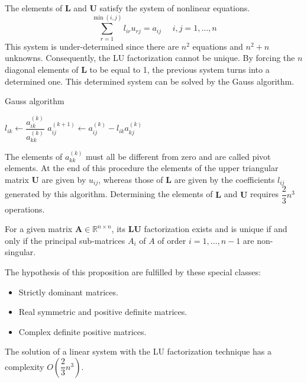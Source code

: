 \documentclass[12pt, a4paper]{report}
\begin{document}
    The elements of $\boldsymbol{L}$ and $\boldsymbol{U}$ satisfy the system of nonlinear equations. 
    \[\sum_{r=1}^{\min{(i,j)}}{l_{ir}u_{rj}}=a_{ij} \:\:\:\:\:\: i,j=1,\dots,n\]
    This system is under-determined since there are $n^2$ equations and $n^2+n$ unknowns. Consequently, the LU factorization cannot be 
    unique. By forcing the $n$ diagonal elements of $\boldsymbol{L}$ to be equal to 1, the previous system turns into a determined 
    one. This determined system can be solved by the Gauss algorithm.
    \begin{algorithm}[H]
        \caption{Gauss algorithm}
            \begin{algorithmic}[1]
                        \State $l_{ik} \leftarrow \dfrac{a_{ik}^{(k)}}{a_{kk}^{(k)}}$
                            \State $a_{ij}^{(k+1)} \leftarrow a_{ij}^{(k)}-l_{ik}a_{kj}^{(k)}$
                        \EndFor
                    \EndFor
                \EndFor
            \end{algorithmic}
    \end{algorithm}
    The elements of $a_{kk}^{(k)}$ must all be different from zero and are called pivot elements. 
    At the end of this procedure the elements of the upper triangular matrix $\boldsymbol{U}$ are given by $u_{ij}$, whereas those of 
    $\boldsymbol{L}$ are given by the coefficients $l_{ij}$ generated by this algorithm. Determining the elements of $\boldsymbol{L}$ 
    and $\boldsymbol{U}$ requires $\dfrac{2}{3}n^3$ operations. 
    \begin{proposition}
        For a given matrix $\boldsymbol{A} \in \mathbb{R}^{n \times n}$, its $\boldsymbol{LU}$ factorization exists and is unique 
        if and only if the principal sub-matrices $A_i$ of $A$ of order $i=1,\dots,n-1$ are non-singular. 
    \end{proposition}
    The hypothesis of this proposition are fulfilled by these special classes: 
    \begin{itemize}
        \item Strictly dominant matrices. 
        \item Real symmetric and positive definite matrices. 
        \item Complex definite positive matrices. 
    \end{itemize}
    The solution of a linear system with the LU factorization technique has a complexity $O(\dfrac{2}{3}n^3)$. 
\end{document}
